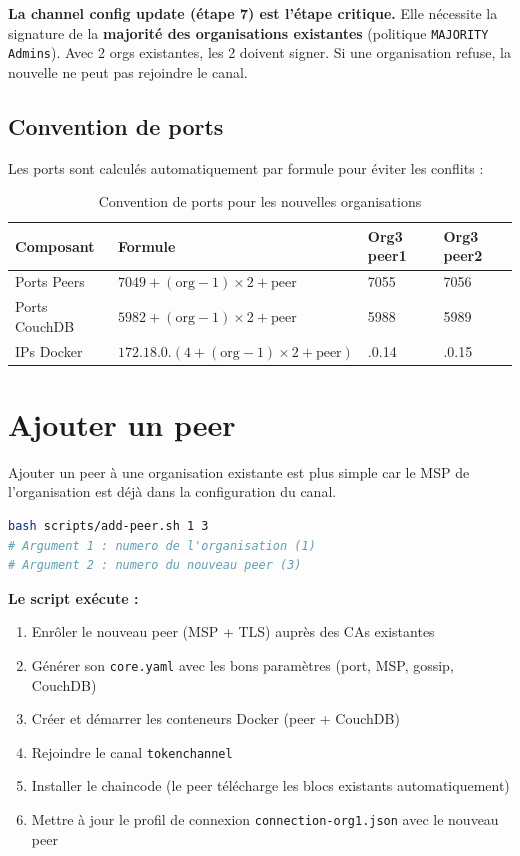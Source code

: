 \documentclass[12pt,a4paper,twoside]{report}
\begin{document}
\begin{warningbox}
\textbf{La channel config update (étape 7) est l'étape critique.} Elle nécessite la signature de la \textbf{majorité des organisations existantes} (politique \texttt{MAJORITY Admins}). Avec 2 orgs existantes, les 2 doivent signer. Si une organisation refuse, la nouvelle ne peut pas rejoindre le canal.
\end{warningbox}

\subsection{Convention de ports}

Les ports sont calculés automatiquement par formule pour éviter les conflits :

\begin{table}[H]
\centering
\begin{tabularx}{\textwidth}{lXll}
\toprule
\textbf{Composant} & \textbf{Formule} & \textbf{Org3 peer1} & \textbf{Org3 peer2} \\
\midrule
Ports Peers & $7049 + (\text{org} - 1) \times 2 + \text{peer}$ & 7055 & 7056 \\
Ports CouchDB & $5982 + (\text{org} - 1) \times 2 + \text{peer}$ & 5988 & 5989 \\
IPs Docker & $172.18.0.(4 + (\text{org} - 1) \times 2 + \text{peer})$ & .0.14 & .0.15 \\
\bottomrule
\end{tabularx}
\caption{Convention de ports pour les nouvelles organisations}
\end{table}

\section{Ajouter un peer}

Ajouter un peer à une organisation existante est plus simple car le MSP de l'organisation est déjà dans la configuration du canal.

\begin{lstlisting}[language=bash, caption=Ajouter peer3 à Org1]
bash scripts/add-peer.sh 1 3
# Argument 1 : numero de l'organisation (1)
# Argument 2 : numero du nouveau peer (3)
\end{lstlisting}

\textbf{Le script exécute :}
\begin{enumerate}
    \item Enrôler le nouveau peer (MSP + TLS) auprès des CAs existantes
    \item Générer son \texttt{core.yaml} avec les bons paramètres (port, MSP, gossip, CouchDB)
    \item Créer et démarrer les conteneurs Docker (peer + CouchDB)
    \item Rejoindre le canal \texttt{tokenchannel}
    \item Installer le chaincode (le peer télécharge les blocs existants automatiquement)
    \item Mettre à jour le profil de connexion \texttt{connection-org1.json} avec le nouveau peer
\end{enumerate}
\end{document}
